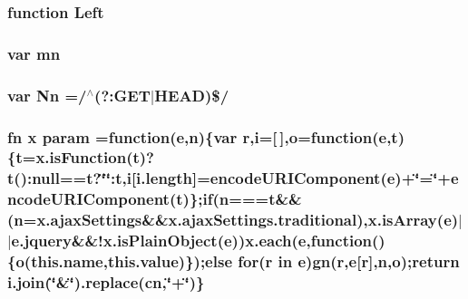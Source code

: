 \subsubsection[{Left}]{\setlength{\rightskip}{0pt plus 5cm}function Left}\label{_bibabook_2_scripts_2jquery-1_810_82_8min_8js_abef68bf244a1159a49fe3a2c153a65d2}
\hypertarget{_bibabook_2_scripts_2jquery-1_810_82_8min_8js_a227fb8e4dbaed5a772526c7e9bb0795f}{}
\subsubsection[{mn}]{\setlength{\rightskip}{0pt plus 5cm}var mn}\label{_bibabook_2_scripts_2jquery-1_810_82_8min_8js_a227fb8e4dbaed5a772526c7e9bb0795f}
\hypertarget{_bibabook_2_scripts_2jquery-1_810_82_8min_8js_a03586bb881647685652f72d98d189ed0}{}
\subsubsection[{Nn}]{\setlength{\rightskip}{0pt plus 5cm}var Nn =/$^\wedge$(?\+:G\+E\+T$\vert$H\+E\+A\+D)\$/}\label{_bibabook_2_scripts_2jquery-1_810_82_8min_8js_a03586bb881647685652f72d98d189ed0}
\hypertarget{_bibabook_2_scripts_2jquery-1_810_82_8min_8js_ae8915303d11557d1b001bc56b6195251}{}
\subsubsection[{param}]{ {\bf fn} {\bf x} param =function({\bf e},n)\{var r,{\bf i}=\mbox{[}$\,$\mbox{]},{\bf o}=function({\bf e},{\bf t})\{{\bf t}={\bf x.\+is\+Function}({\bf t})?{\bf t}()\+:null=={\bf t}?\char`\"{}\char`\"{}\+:{\bf t},{\bf i}\mbox{[}{\bf i.\+length}\mbox{]}=encode\+U\+R\+I\+Component({\bf e})+\char`\"{}=\char`\"{}+encode\+U\+R\+I\+Component({\bf t})\};{\bf if}(n==={\bf t}\&\&(n={\bf x.\+ajax\+Settings}\&\&x.\+ajax\+Settings.\+traditional),x.\+is\+Array({\bf e})$\vert$$\vert$e.\+jquery\&\&!{\bf x.\+is\+Plain\+Object}({\bf e})){\bf x.\+each}({\bf e},function()\{{\bf o}(this.\+name,this.\+value)\});{\bf else} for(r in {\bf e}){\bf gn}(r,{\bf e}\mbox{[}r\mbox{]},n,{\bf o});return i.\+join(\char`\"{}\&\char`\"{}).replace({\bf cn},\char`\"{}+\char`\"{})\}}\label{_bibabook_2_scripts_2jquery-1_810_82_8min_8js_ae8915303d11557d1b001bc56b6195251}
\hypertarget{_bibabook_2_scripts_2jquery-1_810_82_8min_8js_a6a40831f7c967a457dbbd3b5e6f287d7}{}
